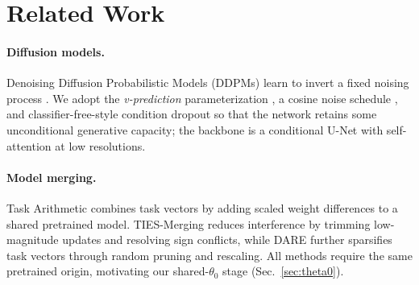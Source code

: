 \documentclass{article}
\begin{document}
\section{Related Work}
\label{sec:related}

\paragraph*{Diffusion models.} Denoising Diffusion Probabilistic Models (DDPMs) learn to invert a fixed noising process \cite{ho2020ddpm}. We adopt the \emph{v-prediction} parameterization \cite{salimans2022progressive}, a cosine noise schedule \cite{nichol2021improved}, and classifier-free-style condition dropout so that the network retains some unconditional generative capacity; the backbone is a conditional U-Net \cite{ronneberger2015unet} with self-attention \cite{vaswani2017attention} at low resolutions.

\paragraph*{Model merging.} Task Arithmetic \cite{ilharco2023editing} combines task vectors by adding scaled weight differences to a shared pretrained model. TIES-Merging \cite{yadav2023ties} reduces interference by trimming low-magnitude updates and resolving sign conflicts, while DARE \cite{yu2024dare} further sparsifies task vectors through random pruning and rescaling. All methods require the same pretrained origin, motivating our shared-$\theta_0$ stage (Sec.~\ref{sec:theta0}).
\end{document}
